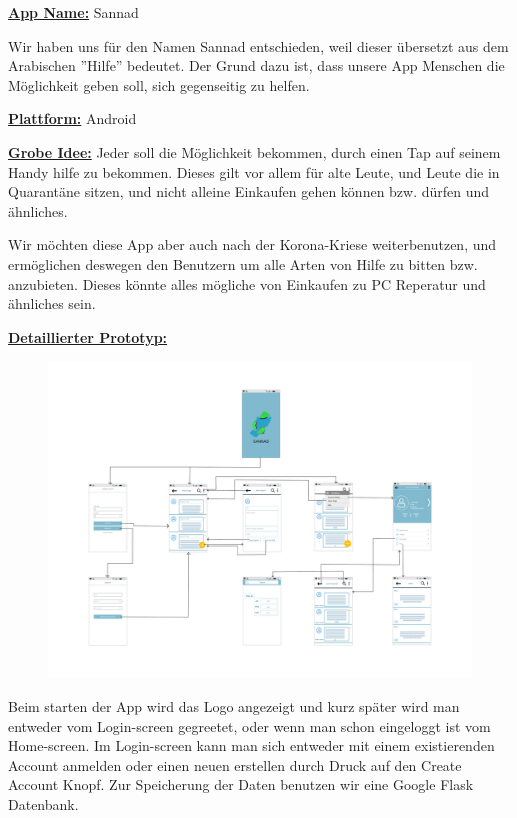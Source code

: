 \documentclass{mobileappdev}
\begin{document}

\underline{\textbf{App Name:}} Sannad

Wir haben uns für den Namen Sannad entschieden, weil dieser übersetzt aus dem Arabischen ''Hilfe'' bedeutet. Der Grund dazu ist, dass unsere App Menschen die Möglichkeit geben soll, sich gegenseitig zu helfen.

\underline{\textbf{Plattform:}} Android

 \underline{\textbf{Grobe Idee:}} Jeder soll die Möglichkeit bekommen, durch einen Tap auf seinem Handy hilfe zu bekommen. Dieses gilt vor allem für alte Leute, und Leute die in Quarantäne sitzen, und nicht alleine Einkaufen gehen können bzw. dürfen und ähnliches.

Wir möchten diese App aber auch nach der Korona-Kriese weiterbenutzen, und ermöglichen deswegen den Benutzern um alle Arten von Hilfe zu bitten bzw. anzubieten. Dieses könnte alles mögliche von Einkaufen zu PC Reperatur und ähnliches sein. 

\underline{\textbf{Detaillierter Prototyp:}} 

\begin{figure}[h!]
\includegraphics[width = \linewidth ]{prototyp.png}
\end{figure}

Beim starten der App wird das Logo angezeigt und kurz später wird man entweder vom Login-screen gegreetet, oder wenn man schon eingeloggt ist vom Home-screen. Im Login-screen kann man sich entweder mit einem existierenden Account anmelden oder einen neuen erstellen durch Druck auf den Create Account Knopf. Zur Speicherung der Daten benutzen wir eine Google Flask Datenbank.
\end{document}

